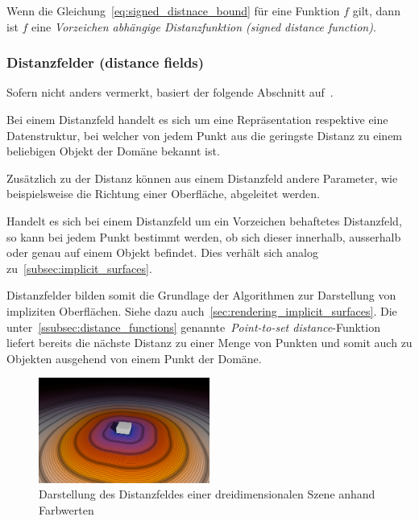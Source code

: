 Wenn die Gleichung~\ref{eq:signed_distnace_bound} für eine Funktion $f$
gilt, dann ist $f$ eine \textit{Vorzeichen abhängige Distanzfunktion
    (signed distance function)}.

\subsubsection{Distanzfelder (distance fields)}
\label{ssubsec:distance_fields}

Sofern nicht anders vermerkt, basiert der folgende Abschnitt
auf~\cite{jones_3d_2006}.

Bei einem Distanzfeld handelt es sich um eine Repräsentation respektive eine
Datenstruktur, bei welcher von jedem Punkt aus die geringste Distanz zu
einem beliebigen Objekt der Domäne bekannt ist.

Zusätzlich zu der Distanz können aus einem Distanzfeld andere Parameter,
wie beispielsweise die Richtung einer Oberfläche, abgeleitet werden.

Handelt es sich bei einem Distanzfeld um ein Vorzeichen behaftetes
Distanzfeld, so kann bei jedem Punkt bestimmt werden, ob sich dieser
innerhalb, ausserhalb oder genau auf einem Objekt befindet. Dies verhält
sich analog zu~\autoref{subsec:implicit_surfaces}.

Distanzfelder bilden somit die Grundlage der Algorithmen zur Darstellung
von impliziten Oberflächen. Siehe dazu
auch~\autoref{sec:rendering_implicit_surfaces}. Die
unter~\autoref{ssubsec:distance_functions} genannte~\textit{Point-to-set
    distance}-Funktion  liefert bereits die nächste Distanz zu einer
Menge von Punkten und somit auch zu Objekten ausgehend von einem Punkt
der Domäne.

\begin{figure}[H]
    \centering
    \includegraphics[width=0.5\textwidth]{img/distance_field.pdf}
    \caption{Darstellung des Distanzfeldes einer dreidimensionalen
        Szene anhand Farbwerten\protect\footnotemark}\label{
        fig:distance_field_illustration}
\end{figure}
